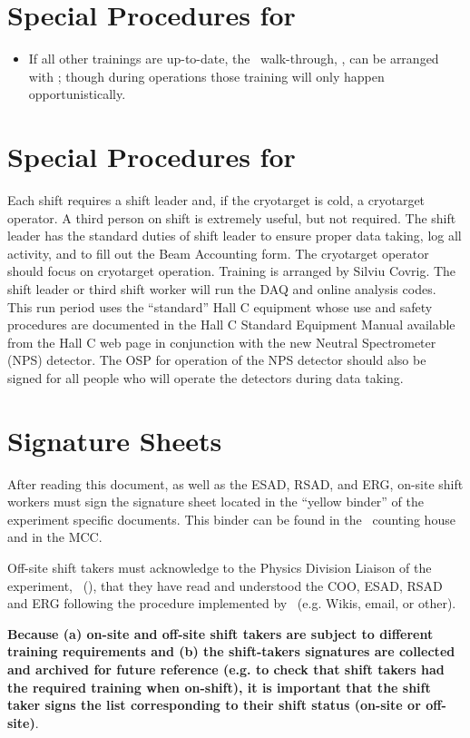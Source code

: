 %
\newpage
\section{Special Procedures for \HALL}

\begin{itemize}

\item{
If all other trainings are up-to-date, the \HALL\ walk-through, \AWARENESS, can be arranged 
with {\WALKTHROUGHTRAINER}; 
though during operations those training will only 
happen opportunistically.   
}
\end{itemize}

%
\newpage
\section{Special Procedures for \EXPTS}

Each shift requires a shift leader and, if the cryotarget is cold, a cryotarget 
operator.  A third person on shift is extremely useful, but not required. The shift leader 
has the standard
duties of shift leader to ensure proper data taking, log all activity, and to fill out
the Beam Accounting form. The cryotarget operator should focus on cryotarget
operation. Training is arranged by Silviu Covrig. The shift leader or third
shift worker will run the DAQ and online analysis codes.
This run period uses the ``standard'' Hall C equipment whose
use and safety procedures are documented in the Hall C Standard Equipment
Manual available from the Hall C web page in conjunction with the new Neutral Spectrometer (NPS) detector. The OSP for operation of the NPS detector should also be signed for all people who will operate the detectors during data taking.


\newpage
\section{Signature Sheets}

After reading this document, as well as the ESAD, RSAD, and ERG, on-site shift workers must sign
the signature sheet located in the ``yellow binder'' of the experiment specific documents.
This binder can be found in the \HALL\ counting house and in the MCC.

Off-site shift takers must acknowledge to the Physics Division Liaison of the experiment, \PHYSDIVLIAISON\ (\PHYSDIVLIAISONEMAIL),
that they have read and understood the COO, ESAD, RSAD and ERG following the procedure implemented by \HALL\ (e.g. Wikis, email, or other).

{\bf Because (a) on-site and off-site shift takers are subject to different training requirements and (b) the shift-takers signatures are collected and archived for future reference (e.g. to check that shift takers had the required training when on-shift), it is important that the shift taker signs the list corresponding to their shift status (on-site or off-site)}.
